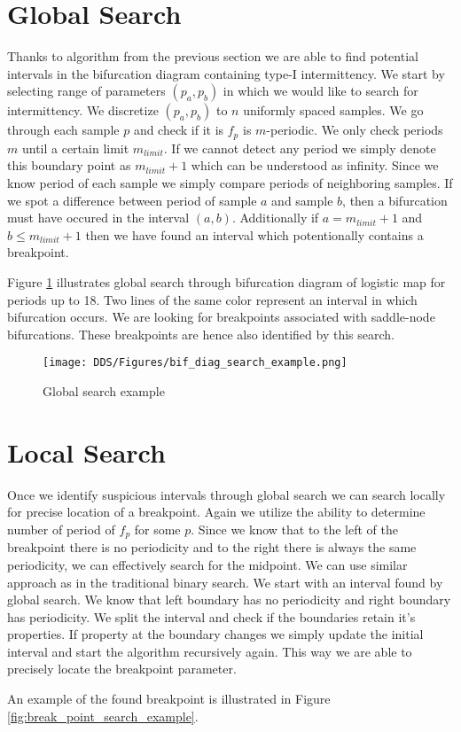 \section{Global Search}
Thanks to algorithm from the previous section we are able to find potential intervals in the bifurcation diagram containing type-I intermittency.
We start by selecting range of parameters $(p_a, p_b)$ in which we would like to search for intermittency.
We discretize $(p_a, p_b)$ to $n$ uniformly spaced samples.
We go through each sample $p$ and check if it is $f_p$ is $m$-periodic.
We only check periods $m$ until a certain limit $m_{limit}$.
If we cannot detect any period we simply denote this boundary point as $m_{limit}+1$ which can be understood as infinity.
Since we know period of each sample we simply compare periods of neighboring samples.
If we spot a difference between period of sample $a$ and sample $b$, then a bifurcation must have occured in the interval $(a, b)$.
Additionally if $a=m_{limit}+1$ and $b \leq m_{limit}+1$ then we have found an interval which potentionally contains a breakpoint.
\par
Figure \ref{fig:bif_diag_search_example} illustrates global search through bifurcation diagram of logistic map for periods up to 18.
Two lines of the same color represent an interval in which bifurcation occurs.
We are looking for breakpoints associated with saddle-node bifurcations.
These breakpoints are hence also identified by this search.

\begin{figure}[!h]
    \centering
    \texttt{[image: DDS/Figures/bif\_diag\_search\_example.png]}
    \caption{Global search example}
    \label{fig:bif_diag_search_example}
\end{figure}

\section{Local Search}
Once we identify suspicious intervals through global search we can search locally for precise location of a breakpoint.
Again we utilize the ability to determine number of period of $f_p$ for some $p$.
Since we know that to the left of the breakpoint there is no periodicity and to the right there is always the same periodicity, we can effectively search for the midpoint.
We can use similar approach as in the traditional binary search.
We start with an interval found by global search.
We know that left boundary has no periodicity and right boundary has periodicity.
We split the interval and check if the boundaries retain it's properties.
If property at the boundary changes we simply update the initial interval and start the algorithm recursively again.
This way we are able to precisely locate the breakpoint parameter.
\par
An example of the found breakpoint is illustrated in Figure \ref{fig:break_point_search_example}.

